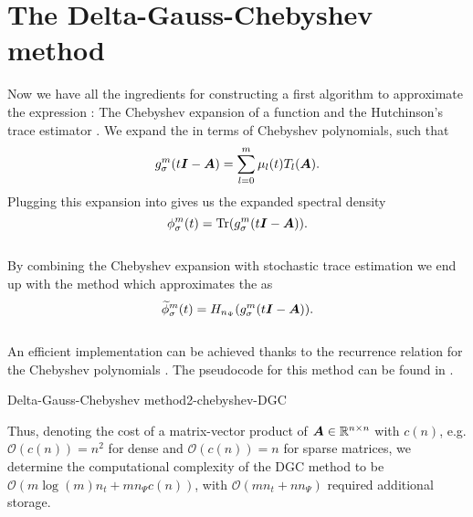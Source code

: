 
\section{The Delta-Gauss-Chebyshev method}
\label{sec:2-chebyshev-delta-gauss-chebyshev}

Now we have all the ingredients for constructing a first algorithm to approximate
the expression :
The Chebyshev expansion of a function 
and the Hutchinson's trace estimator .
We expand the  in terms of Chebyshev polynomials, such that
\begin{equation}
    g_{\sigma}^m(t\boldsymbol{I} - \boldsymbol{A}) = \sum_{l=0}^m \mu_l(t) T_l(\boldsymbol{A}).
    \label{equ:2-chebyshev-chebyshev-expansion}
\end{equation}
Plugging this expansion into 
gives us the expanded spectral density
\begin{equation}
    \phi_{\sigma}^m(t) = \operatorname{Tr}(g_{\sigma}^m(t\boldsymbol{I} - \boldsymbol{A})).
    \label{equ:2-chebyshev-spectral-density-as-trace-expansion}
\end{equation}\\

By combining the Chebyshev expansion 
with stochastic trace estimation
we end up with the  method \cite[algorithm~2]{lin2017randomized}
which approximates the  as
\begin{equation}
    \widetilde{\phi}_{\sigma}^m(t) = H_{n_{\Psi}}(g_{\sigma}^m(t\boldsymbol{I} - \boldsymbol{A})).
    \label{equ:2-chebyshev-DGC-final-estimator}
\end{equation}\\

An efficient implementation can be achieved thanks to the recurrence relation for the
Chebyshev polynomials . The pseudocode
for this method can be found in .
\begin{algo}{Delta-Gauss-Chebyshev method}{2-chebyshev-DGC}
    
\end{algo}

Thus, denoting the cost of a matrix-vector product of $\boldsymbol{A} \in \mathbb{R}^{n \times n}$
with $c(n)$, e.g. $\mathcal{O}(c(n)) = n^2$ for dense and
$\mathcal{O}(c(n)) = n$ for sparse matrices, we determine the computational
complexity of the \gls{DGC} method to be $\mathcal{O}(m \log(m) n_t + m n_{\Psi} c(n))$,
with $\mathcal{O}(m n_t + n n_{\Psi})$ required additional storage.

